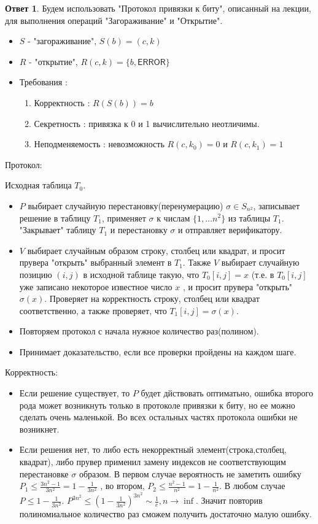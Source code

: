 \documentclass[a4paper]{article}
\theoremstyle{plain}
\theoremstyle{definition}
\newtheorem*{answer}{Ответ}
\begin{document}
\begin{answer} Будем использовать "Протокол привязки к биту", описанный на лекции, для выполнения операций "Загораживание" и "Открытие".
\begin{itemize}
\item $S$ - "загораживание", $S(b) = (c,k)$
\item $R$ - "открытие", $R(c,k) = \{b, \textsf{ERROR}\}$
\item Требования :
    \begin{enumerate}
        \item Корректность : $R(S(b)) = b$
        \item Секретность : привязка к 0 и 1 вычислительно неотличимы.
        \item Неподменяемость : невозможность $R(c,k_0) = 0$ и  $R(c,k_1) = 1$
    \end{enumerate}
\end{itemize} 
\textsf{Протокол:}

Исходная таблица $T_0$. 
\begin{itemize}
    \item $P$ выбирает случайную перестановку(перенумерацию) $\sigma \in S_{n^2}$, записывает решение в таблицу $T_1$, применяет $\sigma$ к числам $\{1,\ldots n^2\}$ из таблицы $T_1$. "Закрывает" таблицу $T_1$ и перестановку $\sigma$ и отправляет верификатору.
    \item $V$ выбирает случайным образом строку, столбец или квадрат, и просит прувера "открыть" выбранный элемент в $T_1$. Также $V$ выбирает случайную позицию $(i,j)$ в исходной таблице такую, что $T_0[i,j] = x$ (т.е. в $T_0[i,j]$ уже записано некоторое известное число $x$ , и просит прувера "открыть" $\sigma (x)$. Проверяет на корректность строку, столбец или квадрат соответственно, а также проверяет, что $T_1[i,j] = \sigma(x)$.
    \item Повторяем протокол с начала нужное количество раз(полином).
    \item Принимает доказательство, если все проверки пройдены на каждом шаге.
\end{itemize}
Корректность: \\
\begin{itemize}
\item Если решение существует, то $P$ будет дйствовать оптиматьно, ошибка второго рода может возникнуть только в протоколе привязки к биту, но ее можно сделать очень маленькой. Во всех остальных частях протокола ошибки не возникнет.
\item Если решения нет, то либо есть некорректный элемент(строка,столбец, квадрат), либо прувер применил замену индексов не соответствующим перестановке $\sigma$ образом. В первом случае вероятность не заметить ошибку
 $P_{1} \leq \frac{3n^2 - 1}{3n^2} = 1 - \frac{1}{3n^2}$ , во втором, $P_2 \leq \frac{n^2 - 1}{n^2} = 1 - \frac{1}{n^2}$. В любом случае $P \leq 1 - \frac{1}{3n^2}$. $P^{3n^2} \leq (1 - \frac{1}{3n^2})^{3n^2} \sim \frac{1}{e} , n \to \inf $. Значит повторив полиномиальное количество раз сможем получить достаточно малую ошибку.
\end{itemize}
\end{answer}
\end{document}
